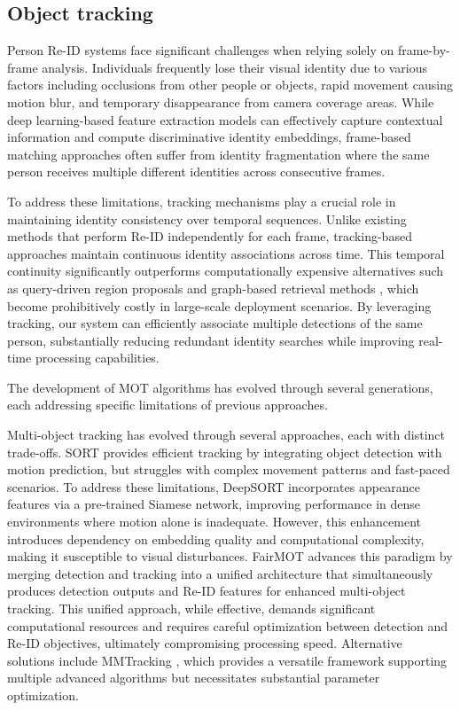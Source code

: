 \documentclass[../main.tex]{subfiles}
\begin{document}
\subsection{Object tracking}
\label{sec:objtrack}

Person Re-ID systems face significant challenges when relying solely on frame-by-frame analysis. Individuals frequently lose their visual identity due to various factors including occlusions from other people or objects, rapid movement causing motion blur, and temporary disappearance from camera coverage areas. While deep learning-based feature extraction models can effectively capture contextual information and compute discriminative identity embeddings, frame-based matching approaches often suffer from identity fragmentation where the same person receives multiple different identities across consecutive frames.

To address these limitations, tracking mechanisms play a crucial role in maintaining identity consistency over temporal sequences. Unlike existing methods that perform Re-ID independently for each frame, tracking-based approaches maintain continuous identity associations across time. This temporal continuity significantly outperforms computationally expensive alternatives such as query-driven region proposals \cite{munjal2019queryguidedendtoendpersonsearch} and graph-based retrieval methods \cite{zhu2025graphbasedapproachesfunctionalitiesretrievalaugmented}, which become prohibitively costly in large-scale deployment scenarios. By leveraging tracking, our system can efficiently associate multiple detections of the same person, substantially reducing redundant identity searches while improving real-time processing capabilities.

The development of MOT algorithms has evolved through several generations, each addressing specific limitations of previous approaches. 

Multi-object tracking has evolved through several approaches, each with distinct trade-offs. SORT \cite{sort} provides efficient tracking by integrating object detection with motion prediction, but struggles with complex movement patterns and fast-paced scenarios. To address these limitations, DeepSORT \cite{deepsort} incorporates appearance features via a pre-trained Siamese network, improving performance in dense environments where motion alone is inadequate. However, this enhancement introduces dependency on embedding quality and computational complexity, making it susceptible to visual disturbances. FairMOT \cite{fairmot} advances this paradigm by merging detection and tracking into a unified architecture that simultaneously produces detection outputs and Re-ID features for enhanced multi-object tracking. This unified approach, while effective, demands significant computational resources and requires careful optimization between detection and Re-ID objectives, ultimately compromising processing speed. Alternative solutions include MMTracking \cite{mmtracking}, which provides a versatile framework supporting multiple advanced algorithms but necessitates substantial parameter optimization.
\end{document}
